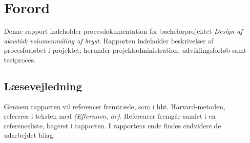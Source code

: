 \chapter*{Forord}

Denne rapport indeholder procesdokumentation for bachelorprojektet \textit{Design af akustisk volumenmåling af bryst}. Rapporten indeholder beskrivelser af procesforløbet i projektet; herunder projektadministration, udviklingsforløb samt testproces. 

\vspace{2cm}


\begin{centering}
\begin{multicols}{2}

\columnbreak
{}

\end{multicols}
\end{centering}

\vspace{1cm}

\section*{Læsevejledning} 
Gennem rapporten vil referencer fremtræde, som i hht. Harvard-metoden, refereres i teksten med \textit{(Efternavn, år)}. Referencer fremgår samlet i en referenceliste, bagerst i rapporten. I rapportens ende findes endvidere de udarbejdet bilag. 

